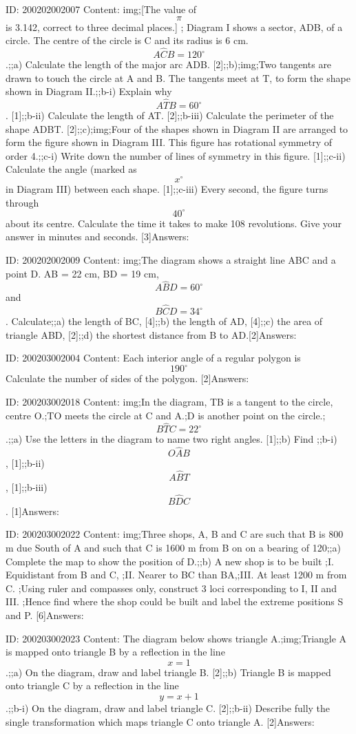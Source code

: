 \documentclass{article}
\begin{document}
ID: 200202002007
Content:
img;[The value of $$\pi$$ is 3.142, correct to three decimal places.] ; Diagram I shows a sector, ADB, of a circle. The centre of the circle is C and its radius is 6 cm. $$A \hat CB=120^{\circ}$$.;;a) Calculate the length of the major arc ADB. [2];;b);img;Two tangents are drawn to touch the circle at A and B. The tangents meet at T, to form the shape shown in Diagram II.;;b-i) Explain why $$A \hat TB=60^{\circ}$$. [1];;b-ii) Calculate the length of AT. [2];;b-iii) Calculate the perimeter of the shape ADBT. [2];;c);img;Four of the shapes shown in Diagram II are arranged to form the figure shown in Diagram III. This figure has rotational symmetry of order 4.;;c-i) Write down the number of lines of symmetry in this figure. [1];;c-ii) Calculate the angle (marked as $$x^{\circ}$$ in Diagram III) between each shape. [1];;c-iii) Every second, the figure turns through $$40^{\circ}$$ about its centre. Calculate the time it takes to make 108 revolutions. Give your answer in minutes and seconds. [3]Answers:

ID: 200202002009
Content:
img;The diagram shows a straight line ABC and a point D. AB = 22 cm, BD = 19 cm, $$A \hat BD=60^{\circ}$$ and $$B \hat CD=34^{\circ}$$. Calculate;;a) the length of BC, [4];;b) the length of AD, [4];;c) the area of triangle ABD, [2];;d) the shortest distance from B to AD.[2]Answers:

ID: 200203002004
Content:
Each interior angle of a regular polygon is $$190^{\circ}$$ Calculate the number of sides of the polygon.   [2]Answers:

ID: 200203002018
Content:
img;In the diagram, TB is a tangent to the circle, centre O.;TO meets the circle at C and A.;D is another point on the circle.;$$B \hat TC = 22^{\circ}$$.;;a) Use the letters in the diagram to name two right angles.   [1];;b) Find ;;b-i) $$O \hat AB$$,   [1];;b-ii) $$A \hat BT$$,   [1];;b-iii) $$B \hat DC$$.   [1]Answers:

ID: 200203002022
Content:
img;Three shops, A, B and C are such that B is 800 m due South of A and such that C is 1600 m from B on on a bearing of 120;;a) Complete the map to show the position of D.;;b) A new shop is to be built ;I. Equidistant from B and C, ;II. Nearer to BC than BA,;III. At least 1200 m from C. ;Using ruler and compasses only, construct 3 loci corresponding to I, II and III. ;Hence find where the shop could be built and label the extreme positions S and P. [6]Answers:

ID: 200203002023
Content:
The diagram below shows triangle A.;img;Triangle A is mapped onto triangle B by a reflection in the line $$x = 1$$.;;a) On the diagram, draw and label triangle B.      [2];;b) Triangle B is mapped onto triangle C by a reflection in the line $$y = x + 1$$.;;b-i) On the diagram, draw and label triangle C.   [2];;b-ii) Describe fully the single transformation which maps triangle C onto triangle A.   [2]Answers:
\end{document}
